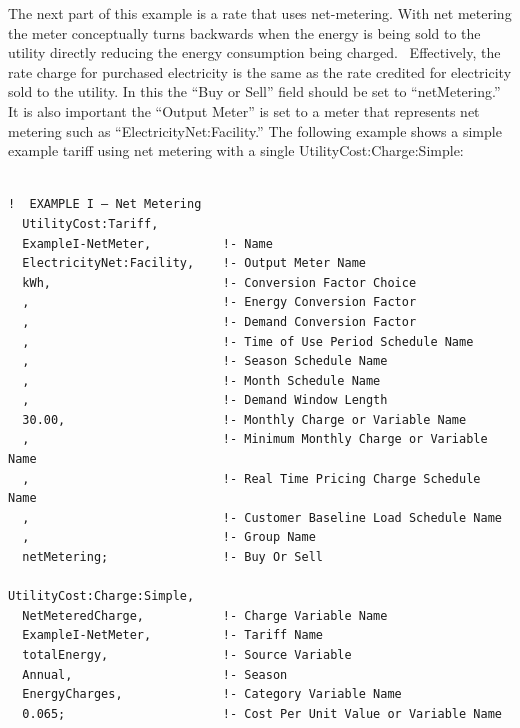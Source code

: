 The next part of this example is a rate that uses net-metering. With net metering the meter conceptually turns backwards when the energy is being sold to the utility directly reducing the energy consumption being charged.~ Effectively, the rate charge for purchased electricity is the same as the rate credited for electricity sold to the utility. In this the ``Buy or Sell'' field should be set to ``netMetering.''~ It is also important the ``Output Meter'' is set to a meter that represents net metering such as ``ElectricityNet:Facility.'' The following example shows a simple example tariff using net metering with a single UtilityCost:Charge:Simple:

\begin{lstlisting}

!  EXAMPLE I – Net Metering
  UtilityCost:Tariff,
  ExampleI-NetMeter,          !- Name
  ElectricityNet:Facility,    !- Output Meter Name
  kWh,                        !- Conversion Factor Choice
  ,                           !- Energy Conversion Factor
  ,                           !- Demand Conversion Factor
  ,                           !- Time of Use Period Schedule Name
  ,                           !- Season Schedule Name
  ,                           !- Month Schedule Name
  ,                           !- Demand Window Length
  30.00,                      !- Monthly Charge or Variable Name
  ,                           !- Minimum Monthly Charge or Variable Name
  ,                           !- Real Time Pricing Charge Schedule Name
  ,                           !- Customer Baseline Load Schedule Name
  ,                           !- Group Name
  netMetering;                !- Buy Or Sell

UtilityCost:Charge:Simple,
  NetMeteredCharge,           !- Charge Variable Name
  ExampleI-NetMeter,          !- Tariff Name
  totalEnergy,                !- Source Variable
  Annual,                     !- Season
  EnergyCharges,              !- Category Variable Name
  0.065;                      !- Cost Per Unit Value or Variable Name
\end{lstlisting}
